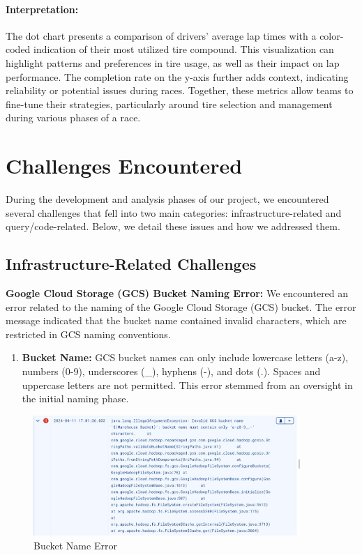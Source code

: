 \documentclass{article}
\begin{document}
\paragraph{Interpretation:}
The dot chart presents a comparison of drivers' average lap times with a color-coded indication of their most utilized tire compound. This visualization can highlight patterns and preferences in tire usage, as well as their impact on lap performance. The completion rate on the y-axis further adds context, indicating reliability or potential issues during races. Together, these metrics allow teams to fine-tune their strategies, particularly around tire selection and management during various phases of a race.

\section{Challenges Encountered}
During the development and analysis phases of our project, we encountered several challenges that fell into two main categories: infrastructure-related and query/code-related. Below, we detail these issues and how we addressed them.

\subsection{Infrastructure-Related Challenges}
\textbf{Google Cloud Storage (GCS) Bucket Naming Error:}
We encountered an error related to the naming of the Google Cloud Storage (GCS) bucket. The error message indicated that the bucket name contained invalid characters, which are restricted in GCS naming conventions.

\begin{enumerate}
    \item \textbf{Bucket Name:} GCS bucket names can only include lowercase letters (a-z), numbers (0-9), underscores (\_), hyphens (-), and dots (.). Spaces and uppercase letters are not permitted. This error stemmed from an oversight in the initial naming phase.
\end{enumerate}

\begin{figure}[H]
    \centering
    \includegraphics[width=0.9\textwidth]{bucket-name.jpeg}
    \caption{Bucket Name Error}
\end{figure}
\end{document}
